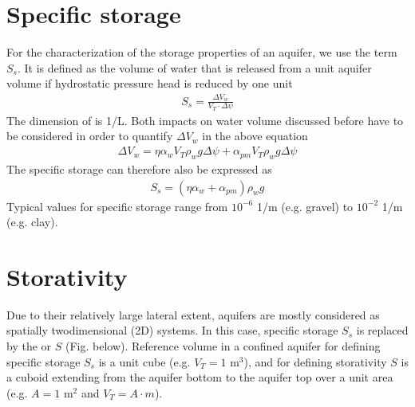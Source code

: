 \documentclass[letterpaper,10pt,english]{jupyterBook}
\begin{document}
\section{Specific storage}
\label{\detokenize{content/flow/L3/13_gw_storage:specific-storage}}
\sphinxAtStartPar
For the characterization of the storage properties of an aquifer, we use the term  \(S_s\). It is defined as the volume of water that is released from a unit aquifer volume if hydrostatic pressure head is reduced by one unit
\begin{equation*}
\begin{split}
S_s = \frac{\Delta V_w}{V_T \cdot \Delta \psi}
\end{split}
\end{equation*}
\sphinxAtStartPar
The dimension of  is 1/L. Both impacts on water volume discussed before have to be considered in order to quantify \(\Delta V_w\) in the above equation
\begin{equation*}
\begin{split}
\Delta V_w = \eta \alpha_w V_T \rho_w g \Delta \psi + \alpha_{pm} V_T\rho_w g \Delta \psi
\end{split}
\end{equation*}
\sphinxAtStartPar
The specific storage can therefore also be expressed as
\begin{equation*}
\begin{split}
S_s = (\eta \alpha_w + \alpha_{pm})\rho_w g
\end{split}
\end{equation*}
\sphinxAtStartPar
Typical values for specific storage range from \(10^{-6}\) 1/m (e.g. gravel) to \(10^{-2}\) 1/m (e.g. clay).


\section{Storativity}
\label{\detokenize{content/flow/L3/13_gw_storage:storativity}}
\sphinxAtStartPar
Due to their relatively large lateral extent, aquifers are mostly considered as spatially two\sphinxhyphen{}dimensional (2D) systems. In this case, specific storage \(S_s\) is replaced by the  or  \(S\) (Fig. below). Reference volume in a confined aquifer for defining specific storage \(S_s\) is a unit cube (e.g. \(V_T = 1\) m\(^3\)), and for defining storativity \(S\) is a cuboid extending from the aquifer bottom to the aquifer top over a unit area (e.g. \(A = 1\) m\(^2\) and \(V_T = A\cdot m\)).
\end{document}
